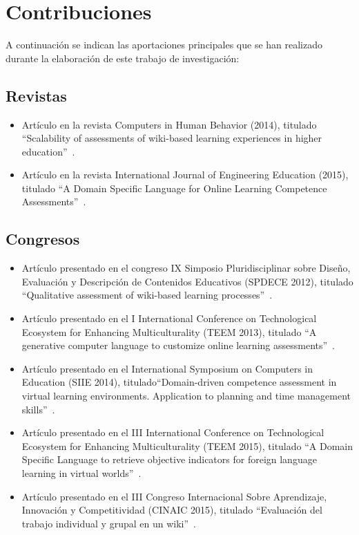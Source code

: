\section{Contribuciones} \label{eva:contribuciones}

	A continuación se indican las aportaciones principales que se han realizado durante la elaboración de este trabajo de investigación:

	\subsection*{Revistas}

	\begin{itemize}
	\item Artículo en la revista Computers in Human Behavior (2014), titulado ``Scalability of assessments of wiki-based learning experiences in higher education''~\cite{palomo2014scalability}.
	\item Artículo en la revista International Journal of Engineering Education (2015), titulado ``A Domain Specific Language for Online Learning Competence Assessments''~\cite{Balderas:2015}.
	\end{itemize}

	\subsection*{Congresos}

	\begin{itemize}
	\item Artículo presentado en el congreso IX Simposio Pluridisciplinar sobre Diseño, Evaluación y Descripción de Contenidos Educativos (SPDECE 2012), titulado ``Qualitative assessment of wiki-based learning processes''~\cite{Balderas:2012}.
	\item Artículo presentado en el I International Conference on Technological Ecosystem for Enhancing Multiculturality (TEEM 2013), titulado ``A generative computer language to customize online learning assessments''~\cite{balderas2013generative}.
	\item Artículo presentado en el International Symposium on Computers in Education (SIIE 2014), titulado``Domain-driven competence assessment in virtual learning environments. Application to planning and time management skills''~\cite{balderas2014domain}.
	\item Artículo presentado en el III International Conference on Technological Ecosystem for Enhancing Multiculturality (TEEM 2015), titulado ``A Domain Specific Language to retrieve objective indicators for foreign language learning in virtual worlds''~\cite{balderas2015domain}.
	\item Artículo presentado en el  III Congreso Internacional Sobre Aprendizaje, Innovación y Competitividad (CINAIC 2015), titulado ``Evaluación del trabajo individual y grupal en un wiki''~\cite{reinoso2015evaluacion}.
	\end{itemize}


